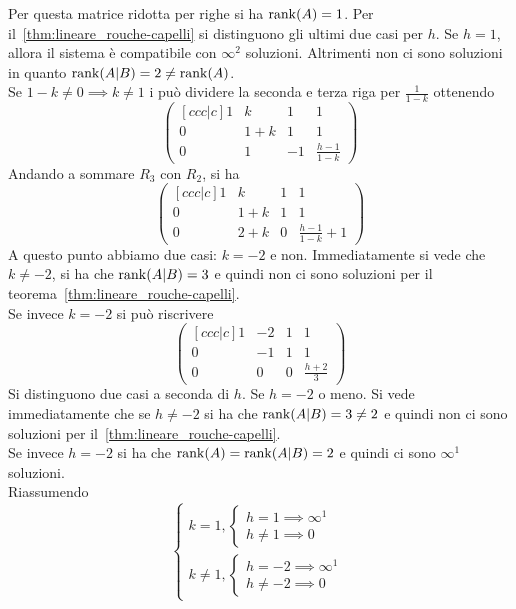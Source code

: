 Per questa matrice ridotta per righe si ha $\rank(A)=1$. Per
il~\autoref{thm:lineare_rouche-capelli} si distinguono gli ultimi due casi per $h$. Se
$h=1$, allora il sistema è compatibile con $\infty^2$ soluzioni. Altrimenti non ci sono
soluzioni in quanto $\rank(A\vert B) = 2 \neq \rank(A)$.\\
Se $1-k\neq0\implies k\neq1$ i può dividere la seconda e terza riga per $\frac{1}{1-k}$
ottenendo
\begin{equation*}
    \begin{pmatrix}[ccc|c]
    1 & k & 1 & 1\\
    0 & 1+k & 1 & 1\\
    0 & 1 & -1 & \frac{h-1}{1-k}
    \end{pmatrix}
\end{equation*}
Andando a sommare $R_3$ con $R_2$, si ha
\begin{equation*}
    \begin{pmatrix}[ccc|c]
    1 & k & 1 & 1\\
    0 & 1+k & 1 & 1\\
    0 & 2+k & 0 & \frac{h-1}{1-k}+1
    \end{pmatrix}
\end{equation*}
A questo punto abbiamo due casi: $k=-2$ e non. Immediatamente si vede che $k\neq-2$, si
ha che $\rank(A\vert B) = 3$ e quindi non ci sono soluzioni per il
teorema~\autoref{thm:lineare_rouche-capelli}.\\
Se invece $k=-2$ si può riscrivere
\begin{equation*}
    \begin{pmatrix}[ccc|c]
      1 & -2 & 1 & 1\\
      0 & -1 & 1 & 1\\
      0 & 0 & 0 & \frac{h+2}{3}
    \end{pmatrix}
\end{equation*}
Si distinguono due casi a seconda di $h$. Se $h=-2$ o meno. Si vede immediatamente che
se $h\neq-2$ si ha che $\rank(A\vert B)=3\neq2$ e quindi non ci sono soluzioni per
il~\autoref{thm:lineare_rouche-capelli}.\\
Se invece $h=-2$ si ha che $\rank(A) = \rank(A\vert B) = 2$ e quindi ci sono $\infty^1$
soluzioni.\\
Riassumendo
\begin{equation*}
  \begin{cases}
    k=1,
    \begin{cases}
      h=1\implies\infty^1\\
      h\neq 1\implies 0
    \end{cases}\\
    k\neq1,
    \begin{cases}
      h=-2\implies\infty^1\\
      h\neq-2\implies 0
    \end{cases}
  \end{cases}
\end{equation*}
